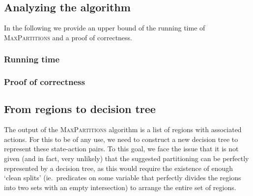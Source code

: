 \begin{algorithm}[!ht]
\begin{algorithmic}[1]
                \EndIf%

            \EndWhile%

            \item[]

        \EndWhile%


    \end{algorithmic}

\end{algorithm}



\subsection{Analyzing the algorithm}%
\label{sub:maxPartsAnalysis}

In the following we provide an upper bound of the running time of
\textsc{MaxPartitions} and a proof of correctness.

\subsubsection{Running time}%
\label{sec:runningTime}

\subsubsection{Proof of correctness}%
\label{sec:proofCorrectness}

\subsection{From regions to decision tree}%
\label{sub:regionsToDT}

The output of the \textsc{MaxPartitions} algorithm is a list of regions with
associated actions. For this to be of any use, we need to construct a new
decision tree to represent these state-action pairs. To this goal, we face the
issue that it is not given (and in fact, very unlikely) that the suggested
partitioning can be perfectly represented by a decision tree, as this would
require the existence of enough `clean splits' (ie.\ predicates on some variable
that perfectly divides the regions into two sets with an empty intersection) to
arrange the entire set of regions.

